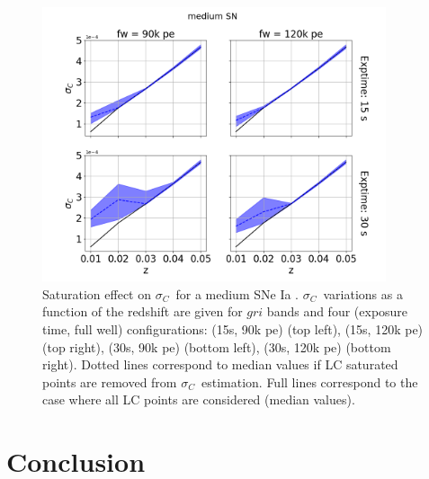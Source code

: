 \documentclass[\docopts]{\docclass}
\newcommand{\sne}{{SNe Ia }}
\newcommand{\pe}{{pe}}
\newcommand{\colorerr}{{$\sigma_C$}}
\begin{document}
\begin{figure}[htbp]
\begin{center}
  \includegraphics[width=0.9\textwidth]{sigmac_medium.png}
 \caption{Saturation effect on \colorerr~for a medium \sne. \colorerr~variations as a function of the redshift are given for $gri$ bands and four (exposure time, full well) configurations: (15s, 90k \pe) (top left),  (15s, 120k \pe) (top right), (30s, 90k \pe) (bottom left),  (30s, 120k \pe) (bottom right). Dotted lines correspond to median values if LC saturated points are removed from \colorerr~estimation. Full lines correspond to the case where all LC points are considered (median values).}\label{fig:sigmamedium}
\end{center}
\end{figure}



\section{Conclusion}
\label{sec:conclusion}
\end{document}
